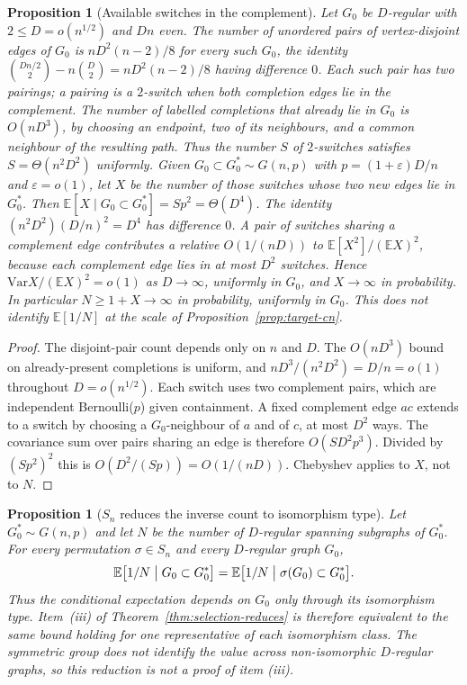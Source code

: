 \documentclass[11pt]{article}
\newtheorem{proposition}[theorem]{Proposition}
\newcommand{\EE}{\mathbb{E}}
\newcommand{\Var}{\mathrm{Var}}
\begin{document}
\begin{proposition}[Available switches in the complement]
\label{prop:host-switches}
Let \(G_0\) be \(D\)-regular with \(2\le D=o(n^{1/2})\) and \(Dn\) even.
The number of unordered pairs of vertex-disjoint edges of \(G_0\) is
\(nD^2(n-2)/8\) for every such \(G_0\), the identity
\(\binom{Dn/2}{2}-n\binom{D}{2}=nD^2(n-2)/8\) having difference \(0\).
Each such pair has two pairings; a pairing is a \(2\)-switch when both
completion edges lie in the complement.
The number of labelled completions that already lie in \(G_0\) is
\(O(nD^3)\), by choosing an endpoint, two of its neighbours, and a
common neighbour of the resulting path.
Thus the number \(S\) of \(2\)-switches satisfies
\(S=\Theta(n^2D^2)\) uniformly.
Given \(G_0\subset G^*_0\sim G(n,p)\) with \(p=(1+\varepsilon)D/n\) and
\(\varepsilon=o(1)\), let \(X\) be the number of those switches whose
two new edges lie in \(G^*_0\).
Then \(\EE[X\mid G_0\subset G^*_0]=Sp^2=\Theta(D^4)\).
The identity \((n^2D^2)(D/n)^2=D^4\) has difference \(0\).
A pair of switches sharing a complement edge contributes a relative
\(O(1/(nD))\) to \(\EE[X^2]/(\EE X)^2\), because each complement edge
lies in at most \(D^2\) switches.
Hence \(\Var X/(\EE X)^2=o(1)\) as \(D\to\infty\), uniformly in \(G_0\),
and \(X\to\infty\) in probability.
In particular \(N\ge 1+X\to\infty\) in probability, uniformly in \(G_0\).
This does not identify \(\EE[1/N]\) at the scale of Proposition~\ref{prop:target-cn}.
\end{proposition}

\begin{proof}
The disjoint-pair count depends only on \(n\) and \(D\).
The \(O(nD^3)\) bound on already-present completions is uniform, and
\(nD^3/(n^2D^2)=D/n=o(1)\) throughout \(D=o(n^{1/2})\).
Each switch uses two complement pairs, which are independent
Bernoulli(\(p\)) given containment.
A fixed complement edge \(ac\) extends to a switch by choosing a
\(G_0\)-neighbour of \(a\) and of \(c\), at most \(D^2\) ways.
The covariance sum over pairs sharing an edge is therefore
\(O(SD^2p^3)\).
Divided by \((Sp^2)^2\) this is \(O(D^2/(Sp))=O(1/(nD))\).
Chebyshev applies to \(X\), not to \(N\).
\end{proof}

\begin{proposition}[\(S_n\) reduces the inverse count to isomorphism type]
\label{prop:sn-orbit}
Let \(G^*_0\sim G(n,p)\) and let \(N\) be the number of \(D\)-regular spanning
subgraphs of \(G^*_0\).
For every permutation \(\sigma\in S_n\) and every \(D\)-regular graph \(G_0\),
\[
\EE\bigl[1/N\bigm|G_0\subset G^*_0\bigr]
=
\EE\bigl[1/N\bigm|\sigma(G_0)\subset G^*_0\bigr].
\]
Thus the conditional expectation depends on \(G_0\) only through its
isomorphism type.
Item~(iii) of Theorem~\ref{thm:selection-reduces} is therefore equivalent to
the same bound holding for one representative of each isomorphism class.
The symmetric group does not identify the value across non-isomorphic
\(D\)-regular graphs, so this reduction is not a proof of item (iii).
\end{proposition}
\end{document}
